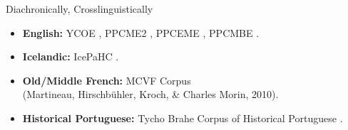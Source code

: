 \documentclass[hyperref={pdfpagelabels=false}]{beamer}
\begin{document}












\begin{frame}{Diachronically, Crosslinguistically}
\begin{itemize}
	\item \textbf{English:} YCOE \citep{ycoe}, PPCME2 \citep{ppcme2}, PPCEME \citep{ppceme}, PPCMBE \citep{ppcmbe}.
	\item \textbf{Icelandic:} IcePaHC \citep{icepahc09}.
	\item \textbf{Old/Middle French:} MCVF Corpus \\(Martineau, Hirschbühler, Kroch, \& Charles Morin, 2010)\nocite{mcvf}.
	\item \textbf{Historical Portuguese:} Tycho Brahe Corpus of Historical Portuguese \citep{tychobrahe}.
	\end{itemize}

\end{frame}





\end{document}
